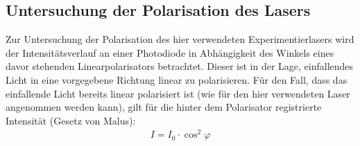 \documentclass[11pt, a4paper]{article}
\numberwithin{equation}{section}
\begin{document}
\subsection{Untersuchung der Polarisation des Lasers}
\label{ssec:polarisation}
Zur Untersuchung der Polarisation des hier verwendeten Experimentierlasers wird der Intensitätsverlauf an einer Photodiode in Abhängigkeit des Winkels eines davor stehenden Linearpolarisators betrachtet.
Dieser ist in der Lage, einfallendes Licht in eine vorgegebene Richtung linear zu polarisieren.
Für den Fall, dass das einfallende Licht bereits linear polarisiert ist (wie für den hier verwendeten Laser angenommen werden kann), gilt für die hinter dem Polarisator registrierte Intensität (Gesetz von Malus):
\begin{align}
I=I_0\cdot\cos^2\varphi
\end{align}
\end{document}
